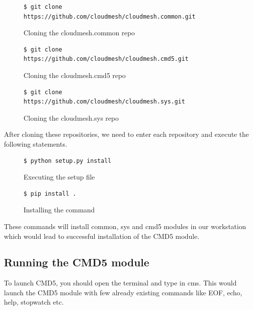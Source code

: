 \documentclass[9pt,twocolumn,twoside]{../../styles/osajnl}
\begin{document}
\begin{figure}[H]
\begin{verbatim}
$ git clone
https://github.com/cloudmesh/cloudmesh.common.git
\end{verbatim}
\caption{Cloning the cloudmesh.common repo}
\label{Cloning the cloudmesh.common repo}
\end{figure}

\begin{figure}[H]
\begin{verbatim}
$ git clone
https://github.com/cloudmesh/cloudmesh.cmd5.git
\end{verbatim}
\caption{Cloning the cloudmesh.cmd5 repo}
\label{Cloning the cloudmesh.cmd5 repo}
\end{figure}

\begin{figure}[H]
\begin{verbatim}
$ git clone
https://github.com/cloudmesh/cloudmesh.sys.git
\end{verbatim}
\caption{Cloning the cloudmesh.sys repo}
\label{Cloning the cloudmesh.sys repo}
\end{figure}

\noindent
After cloning these repositories, we need to enter each repository and
execute the following statements.
\newline

\begin{figure}[H]
\begin{verbatim}
$ python setup.py install
\end{verbatim}
\caption{Executing the setup file}
\label{Executing the setup file}
\end{figure}

\begin{figure}[H]
\begin{verbatim}
$ pip install .
\end{verbatim}
\caption{Installing the command}
\label{Installing the command}
\end{figure}

\noindent
These commands will install common, sys and cmd5 modules in our
workstation which would lead to successful installation of the CMD5
module.

\subsection{Running the CMD5 module}
To launch CMD5, you should open the terminal and type in cms. This
would launch the CMD5 module with few already existing commands like
EOF, echo, help, stopwatch etc.
\end{document}
